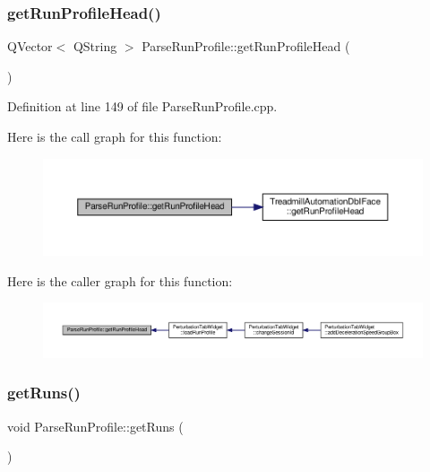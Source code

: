 \subsubsection{\texorpdfstring{get\+Run\+Profile\+Head()}{getRunProfileHead()}}
{\footnotesize\ttfamily Q\+Vector$<$ Q\+String $>$ Parse\+Run\+Profile\+::get\+Run\+Profile\+Head (\begin{DoxyParamCaption}{ }\end{DoxyParamCaption})}



Definition at line 149 of file Parse\+Run\+Profile.\+cpp.

Here is the call graph for this function\+:
\nopagebreak
\begin{figure}[H]
\begin{center}
\leavevmode
\includegraphics[width=350pt]{class_parse_run_profile_abb40056301c358e483699910dae9e83c_cgraph}
\end{center}
\end{figure}
Here is the caller graph for this function\+:
\nopagebreak
\begin{figure}[H]
\begin{center}
\leavevmode
\includegraphics[width=350pt]{class_parse_run_profile_abb40056301c358e483699910dae9e83c_icgraph}
\end{center}
\end{figure}
\mbox{\label{class_parse_run_profile_a285a6e835fe873d2a88fa1415224c66a}} 
\subsubsection{\texorpdfstring{get\+Runs()}{getRuns()}}
{\footnotesize\ttfamily void Parse\+Run\+Profile\+::get\+Runs (\begin{DoxyParamCaption}{ }\end{DoxyParamCaption})}



